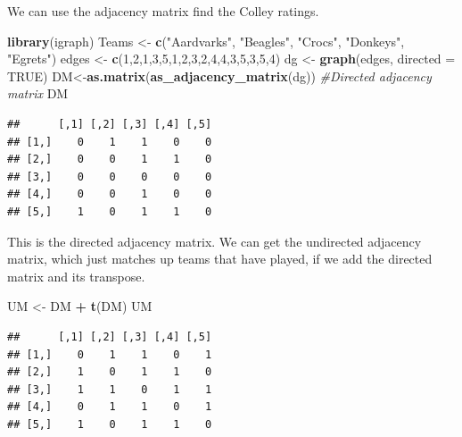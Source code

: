 \documentclass[
]{book}
\newenvironment{Shaded}{\begin{snugshade}}{\end{snugshade}}
\newcommand{\AttributeTok}[1]{\textcolor[rgb]{0.13,0.29,0.53}{#1}}
\newcommand{\CommentTok}[1]{\textcolor[rgb]{0.56,0.35,0.01}{\textit{#1}}}
\newcommand{\ConstantTok}[1]{\textcolor[rgb]{0.56,0.35,0.01}{#1}}
\newcommand{\DecValTok}[1]{\textcolor[rgb]{0.00,0.00,0.81}{#1}}
\newcommand{\FunctionTok}[1]{\textcolor[rgb]{0.13,0.29,0.53}{\textbf{#1}}}
\newcommand{\NormalTok}[1]{#1}
\newcommand{\OtherTok}[1]{\textcolor[rgb]{0.56,0.35,0.01}{#1}}
\newcommand{\SpecialCharTok}[1]{\textcolor[rgb]{0.81,0.36,0.00}{\textbf{#1}}}
\newcommand{\StringTok}[1]{\textcolor[rgb]{0.31,0.60,0.02}{#1}}
\theoremstyle{definition}
\theoremstyle{definition}
\theoremstyle{definition}
\theoremstyle{definition}
\theoremstyle{remark}
\begin{document}
We can use the adjacency matrix find the Colley ratings.

\begin{Shaded}
\begin{Highlighting}[]
\FunctionTok{library}\NormalTok{(igraph)}
\NormalTok{Teams }\OtherTok{\textless{}{-}} \FunctionTok{c}\NormalTok{(}\StringTok{"Aardvarks"}\NormalTok{, }\StringTok{"Beagles"}\NormalTok{, }\StringTok{"Crocs"}\NormalTok{,  }
            \StringTok{"Donkeys"}\NormalTok{, }\StringTok{"Egrets"}\NormalTok{)}
\NormalTok{edges }\OtherTok{\textless{}{-}} \FunctionTok{c}\NormalTok{(}\DecValTok{1}\NormalTok{,}\DecValTok{2}\NormalTok{,}\DecValTok{1}\NormalTok{,}\DecValTok{3}\NormalTok{,}\DecValTok{5}\NormalTok{,}\DecValTok{1}\NormalTok{,}\DecValTok{2}\NormalTok{,}\DecValTok{3}\NormalTok{,}\DecValTok{2}\NormalTok{,}\DecValTok{4}\NormalTok{,}\DecValTok{4}\NormalTok{,}\DecValTok{3}\NormalTok{,}\DecValTok{5}\NormalTok{,}\DecValTok{3}\NormalTok{,}\DecValTok{5}\NormalTok{,}\DecValTok{4}\NormalTok{)}
\NormalTok{dg }\OtherTok{\textless{}{-}} \FunctionTok{graph}\NormalTok{(edges, }\AttributeTok{directed =} \ConstantTok{TRUE}\NormalTok{)}
\NormalTok{DM}\OtherTok{\textless{}{-}}\FunctionTok{as.matrix}\NormalTok{(}\FunctionTok{as\_adjacency\_matrix}\NormalTok{(dg)) }\CommentTok{\#Directed adjacency matrix}
\NormalTok{DM}
\end{Highlighting}
\end{Shaded}

\begin{verbatim}
##      [,1] [,2] [,3] [,4] [,5]
## [1,]    0    1    1    0    0
## [2,]    0    0    1    1    0
## [3,]    0    0    0    0    0
## [4,]    0    0    1    0    0
## [5,]    1    0    1    1    0
\end{verbatim}

This is the directed adjacency matrix. We can get the undirected adjacency matrix, which just matches up teams that have played, if we add the directed matrix and its transpose.

\begin{Shaded}
\begin{Highlighting}[]
\NormalTok{UM }\OtherTok{\textless{}{-}}\NormalTok{ DM }\SpecialCharTok{+} \FunctionTok{t}\NormalTok{(DM)}
\NormalTok{UM}
\end{Highlighting}
\end{Shaded}

\begin{verbatim}
##      [,1] [,2] [,3] [,4] [,5]
## [1,]    0    1    1    0    1
## [2,]    1    0    1    1    0
## [3,]    1    1    0    1    1
## [4,]    0    1    1    0    1
## [5,]    1    0    1    1    0
\end{verbatim}
\end{document}
